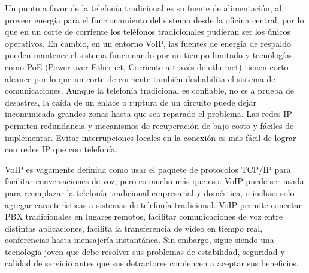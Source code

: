 	Un punto a favor de la telefonía tradicional es su fuente de alimentación, 
	al proveer energía para el funcionamiento del sistema desde la oficina central,
	 por lo que en un corte de corriente los teléfonos tradicionales pudieran ser 
	 los únicos operativos. En cambio, en un entorno VoIP, las fuentes de energía 
	 de respaldo pueden mantener el sistema funcionando por un tiempo limitado y 
	 tecnologías como PoE (Power over Ethernet, Corriente a través de ethernet) 
	 tienen corto alcance por lo que un corte de corriente también deshabilita el 
	 sistema de comunicaciones. Aunque la telefonía tradicional es confiable, no
	  es a prueba de desastres, la caída de un enlace o ruptura de un circuito 
	  puede dejar incomunicada grandes zonas hasta que sea reparado el problema. 
	  Las redes IP permiten redundancia y mecanismos de recuperación de bajo costo 
	  y fáciles de implementar. Evitar interrupciones locales en la conexión es más 
	  fácil de lograr con redes IP que con telefonía. 
	  
	VoIP es vagamente definida como usar el paquete de protocolos TCP/IP para 
	facilitar conversaciones de voz, pero es mucho más que eso. VoIP puede ser 
	usada para reemplazar la telefonía tradicional empresarial y doméstica, o 
	incluso solo agregar características a sistemas de telefonía tradicional. 
	VoIP permite conectar PBX tradicionales en lugares remotos, facilitar comunicaciones 
	de voz entre distintas aplicaciones, facilita la transferencia de video en tiempo 
	real, conferencias hasta mensajería instantánea. Sin embargo, sigue siendo una 
	tecnología joven que debe resolver sus problemas de estabilidad, seguridad y 
	calidad de servicio antes que sus detractores comiencen a aceptar sus beneficios.